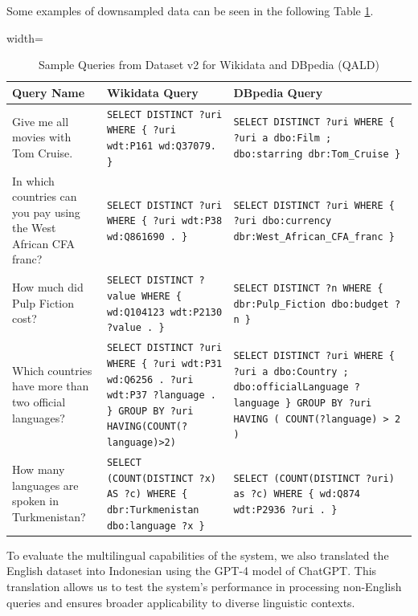 

Some examples of downsampled data can be seen in the following Table \ref{table-queries-v2}.

\begin{table}
\centering
\renewcommand{\arraystretch}{1.15}
\setlength{\tabcolsep}{12pt}
\begin{adjustbox}{width=\textwidth}
    \begin{tabular}{| m{} | m{} |  m{} |}
    \hline
    \textbf{Query Name} & \textbf{Wikidata Query} & \textbf{DBpedia Query}\\
    \hline
    Give me all movies with Tom Cruise. & \texttt{SELECT DISTINCT ?uri WHERE \{ ?uri wdt:P161 wd:Q37079. \}} & \texttt{SELECT DISTINCT ?uri WHERE \{ ?uri a dbo:Film ; dbo:starring dbr:Tom\_Cruise \}} \\
    \hline
    In which countries can you pay using the West African CFA franc? & \texttt{SELECT DISTINCT ?uri WHERE \{ ?uri wdt:P38 wd:Q861690 . \}} & \texttt{SELECT DISTINCT ?uri WHERE \{ ?uri dbo:currency dbr:West\_African\_CFA\_franc \}} \\
    \hline
    How much did Pulp Fiction cost? & \texttt{SELECT DISTINCT ?value WHERE \{ wd:Q104123 wdt:P2130 ?value . \}} & \texttt{SELECT DISTINCT ?n WHERE \{ dbr:Pulp\_Fiction dbo:budget ?n \}} \\
    \hline
    Which countries have more than two official languages? & \texttt{SELECT DISTINCT ?uri WHERE \{ ?uri wdt:P31 wd:Q6256 . ?uri wdt:P37 ?language . \} GROUP BY ?uri HAVING(COUNT(?language)>2)} & \texttt{SELECT DISTINCT ?uri WHERE \{ ?uri a dbo:Country ; dbo:officialLanguage ?language \} GROUP BY ?uri HAVING ( COUNT(?language) > 2 )} \\
    \hline
    How many languages are spoken in Turkmenistan? & \texttt{SELECT (COUNT(DISTINCT ?x) AS ?c) WHERE \{ dbr:Turkmenistan dbo:language ?x \}} & \texttt{SELECT (COUNT(DISTINCT ?uri) as ?c) WHERE \{ wd:Q874 wdt:P2936 ?uri . \}} \\
    \hline
    \end{tabular}
\end{adjustbox}
\vspace{1em}
\caption{Sample Queries from Dataset v2 for Wikidata and DBpedia (QALD)}
\label{table-queries-v2}
\end{table}

To evaluate the multilingual capabilities of the system, we also translated the English dataset into Indonesian using the GPT-4 model of ChatGPT. This translation allows us to test the system's performance in processing non-English queries and ensures broader applicability to diverse linguistic contexts.

